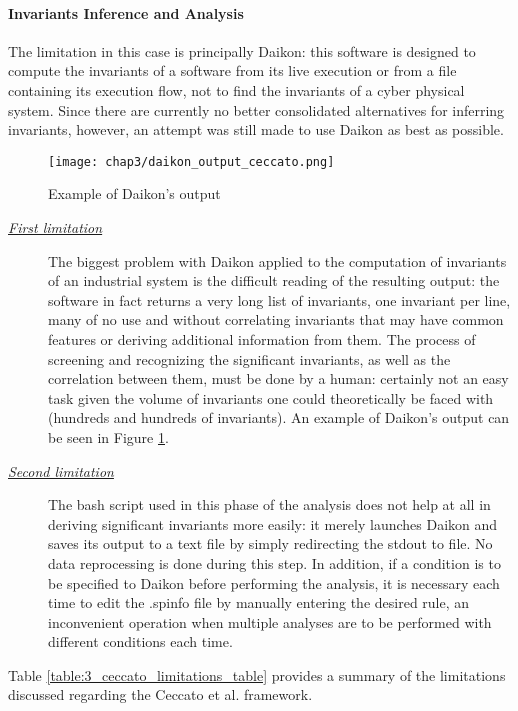 \paragraph{Invariants Inference and Analysis}
\label{par:3_invariant_limitations}
The limitation in this case is principally Daikon: this software is designed to compute the invariants of a software from its live execution or from a file containing its execution flow, not to find the invariants of a cyber physical system. Since there are currently no better consolidated alternatives for inferring invariants, however, an attempt was still made to use Daikon as best as possible.

\begin{figure}[ht]
	\centering
	\texttt{[image: chap3/daikon\_output\_ceccato.png]}
	\caption{Example of Daikon's output}
	\label{fig:daikon_output_ceccato}
\end{figure}

\begin{description}
	\item[\emph{\underline{First limitation}}] The biggest problem with Daikon applied to the computation of invariants of an industrial system is the difficult reading of the resulting output: the software in fact returns a very long list of invariants, one invariant per line, many of no use and without correlating invariants that may have common features or deriving additional information from them. The process of screening and recognizing the significant invariants, as well as the correlation between them, must be done by a human: certainly not an easy task given the volume of invariants one could theoretically be faced with (hundreds and hundreds of invariants). An example of Daikon's output can be seen in Figure \ref{fig:daikon_output_ceccato}.

	\item[\emph{\underline{Second limitation}}] The bash script used in this phase of the analysis does not help at all in deriving significant invariants more easily: it merely launches Daikon and saves its output to a text file by simply redirecting the stdout to file. No data reprocessing is done during this step. In addition, if a condition is to be specified to Daikon before performing the analysis, it is necessary each time to edit the .spinfo file by manually entering the desired rule, an inconvenient operation when multiple analyses are to be performed with different conditions each time. 
\end{description}
Table \ref{table:3_ceccato_limitations_table} provides a summary of the limitations discussed regarding the Ceccato et al. framework.

